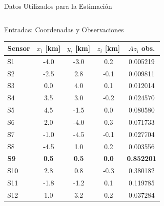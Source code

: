 \begin{frame}{Datos Utilizados para la Estimación}

    \begin{columns}[T]
        \begin{block}{Entradas: Coordenadas y Observaciones}
            \centering
            \scriptsize 
            \begin{tabular}{@{}lcccc@{}}
                \toprule
                \textbf{Sensor} & \textbf{$x_i$ [km]} & \textbf{$y_i$ [km]} & \textbf{$z_i$ [km]} & \textbf{$Az_i$ obs.} \\ \midrule
                S1  & -4.0 & -3.0 &  0.2 & 0.005219 \\
                S2  & -2.5 &  2.8 & -0.1 & 0.009811 \\
                S3  &  0.0 &  4.0 &  0.1 & 0.012014 \\
                S4  &  3.5 &  3.0 & -0.2 & 0.024570 \\
                S5  &  4.5 & -1.5 &  0.0 & 0.080580 \\
                S6  &  2.0 & -4.0 &  0.3 & 0.071733 \\
                S7  & -1.0 & -4.5 & -0.1 & 0.027704 \\
                S8  & -4.5 &  1.0 &  0.2 & 0.003556 \\
                \textbf{S9}  & \textbf{0.5} & \textbf{0.5} & \textbf{0.0} & \textbf{0.852201} \\
                S10 &  2.8 &  0.8 & -0.3 & 0.380182 \\
                S11 & -1.8 & -1.2 &  0.1 & 0.119785 \\
                S12 &  1.0 &  3.2 &  0.2 & 0.037284 \\ \bottomrule
            \end{tabular}
        \end{block}

        \vspace{0.5cm}


\end{columns}
\end{frame}
